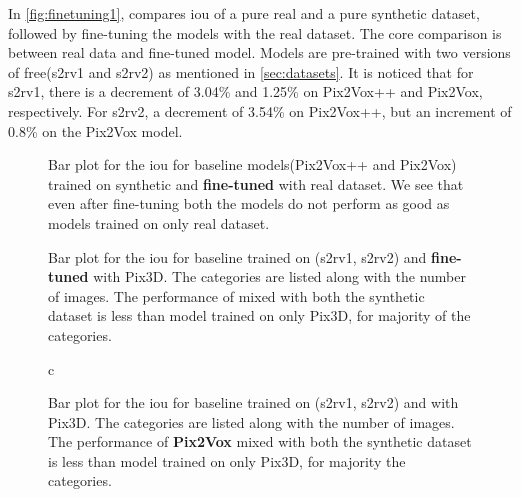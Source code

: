 In \autoref{fig:finetuning1}, compares \gls{iou} of a pure real and a pure synthetic dataset, followed by fine-tuning the models with the real dataset.
The core comparison is between real data and fine-tuned model.
Models are pre-trained with two versions of \gls{free}(\gls{s2rv1} and \gls{s2rv2}) as mentioned in \autoref{sec:datasets}.
It is noticed that for \gls{s2rv1}, there is a decrement of 3.04\% and 1.25\% on Pix2Vox++ and Pix2Vox, respectively.
For \gls{s2rv2}, a decrement of 3.54\% on Pix2Vox++, but an increment of 0.8\% on the Pix2Vox model.

\begin{figure}[ht]
    \centering
    \resizebox{0.75\textwidth}{!}{}
    \caption{Bar plot for the \gls{iou} for baseline models(Pix2Vox++ and Pix2Vox) trained on synthetic and \textbf{fine-tuned} with real dataset.
    We see that even after fine-tuning both the models do not perform as good as models trained on only real dataset.}
    \label{fig:finetuning1}
\end{figure}


\begin{figure}[!ht]
    \centering
    \resizebox{0.7\textwidth}{!}{}
    \caption{Bar plot for the \gls{iou} for baseline  trained on (\gls{s2rv1}, \gls{s2rv2}) and \textbf{fine-tuned} with Pix3D.
    The categories are listed along with the number of images.
    The performance of  mixed with both the synthetic dataset is less than model trained on only Pix3D, for majority of the categories.}
    \label{fig:finetuning2}
\end{figure}

\begin{figure}[!ht]c
    \centering
    \resizebox{0.7\textwidth}{!}{}
    \caption{Bar plot for the \gls{iou} for baseline  trained on (\gls{s2rv1}, \gls{s2rv2}) and  with Pix3D.
    The categories are listed along with the number of images.
    The performance of \textbf{Pix2Vox} mixed with both the synthetic dataset is less than model trained on only Pix3D, for majority the categories.}
    \label{fig:finetuning3}
\end{figure}

